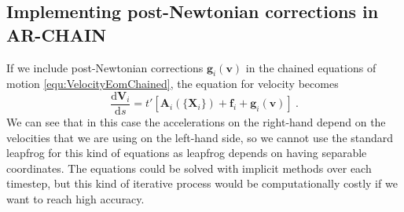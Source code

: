 \documentclass[english, oneside]{HYgradu}
\begin{document}
\subsection{Implementing post-Newtonian corrections in AR-CHAIN}

If we include post-Newtonian corrections $\boldsymbol{g}_i(\mathbf{v})$ in the chained equations of motion \eqref{equ:VelocityEomChained}, the equation for velocity becomes
\begin{equation}
\frac{\mathrm{d}\boldsymbol{V}_i}{\mathrm{d}s} = t' [ \boldsymbol{A}_i(\{ \boldsymbol{X}_i \}) + \boldsymbol{f}_i + \boldsymbol{g}_i(\mathbf{v})] \ .
\end{equation}
We can see that in this case the accelerations on the right-hand depend on the velocities that we are using on the left-hand side, so we cannot use the standard leapfrog for this kind of equations as leapfrog depends on having separable coordinates. The equations could be solved with implicit methods over each timestep, but this kind of iterative process would be computationally costly if we want to reach high accuracy.
\end{document}

